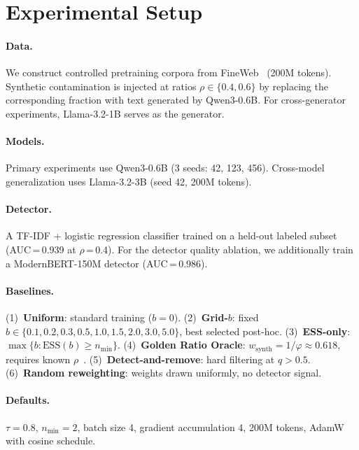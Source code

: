 \documentclass[11pt,a4paper]{article}
\newcommand{\nmin}{n_{\min}}
\begin{document}
\section{Experimental Setup}
\label{sec:setup}

\paragraph{Data.}
We construct controlled pretraining corpora from FineWeb~\citep{fineweb} (200M tokens).
Synthetic contamination is injected at ratios $\rho\in\{0.4, 0.6\}$ by replacing the corresponding fraction with text generated by Qwen3-0.6B.
For cross-generator experiments, Llama-3.2-1B serves as the generator.

\paragraph{Models.}
Primary experiments use Qwen3-0.6B (3 seeds: 42, 123, 456).
Cross-model generalization uses Llama-3.2-3B (seed 42, 200M tokens).

\paragraph{Detector.}
A TF-IDF + logistic regression classifier trained on a held-out labeled subset (AUC\,=\,0.939 at $\rho$\,=\,0.4).
For the detector quality ablation, we additionally train a ModernBERT-150M detector (AUC\,=\,0.986).

\paragraph{Baselines.}
(1)~\textbf{Uniform}: standard training ($b=0$).
(2)~\textbf{Grid-$b$}: fixed $b\in\{0.1,0.2,0.3,0.5,1.0,1.5,2.0,3.0,5.0\}$, best selected post-hoc.
(3)~\textbf{ESS-only}: $\max\{b:\mathrm{ESS}(b)\geq\nmin\}$.
(4)~\textbf{Golden Ratio Oracle}: $w_{\text{synth}}=1/\varphi\approx0.618$, requires known $\rho$~\citep{golden-ratio}.
(5)~\textbf{Detect-and-remove}: hard filtering at $q>0.5$.
(6)~\textbf{Random reweighting}: weights drawn uniformly, no detector signal.

\paragraph{Defaults.}
$\tau=0.8$, $\nmin=2$, batch size 4, gradient accumulation 4, 200M tokens, AdamW with cosine schedule.
\end{document}
